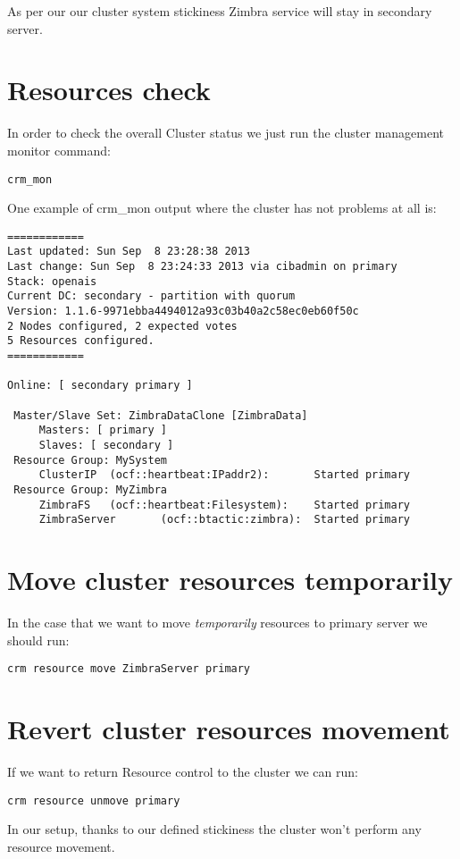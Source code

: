 As per our our cluster system stickiness Zimbra service will stay in secondary server.

\section {Resources check}
In order to check the overall Cluster status we just run the cluster management monitor command:
\begin{verbatim}
crm_mon
\end{verbatim}

One example of crm\_mon output where the cluster has not problems at all is:
\begin{verbatim}
============
Last updated: Sun Sep  8 23:28:38 2013
Last change: Sun Sep  8 23:24:33 2013 via cibadmin on primary
Stack: openais
Current DC: secondary - partition with quorum
Version: 1.1.6-9971ebba4494012a93c03b40a2c58ec0eb60f50c
2 Nodes configured, 2 expected votes
5 Resources configured.
============

Online: [ secondary primary ]

 Master/Slave Set: ZimbraDataClone [ZimbraData]
     Masters: [ primary ]
     Slaves: [ secondary ]
 Resource Group: MySystem
     ClusterIP  (ocf::heartbeat:IPaddr2):       Started primary
 Resource Group: MyZimbra
     ZimbraFS   (ocf::heartbeat:Filesystem):    Started primary
     ZimbraServer       (ocf::btactic:zimbra):  Started primary
\end{verbatim}

\section {Move cluster resources temporarily}
In the case that we want to move \textit{temporarily} resources to primary server we should run:
\begin{verbatim}
crm resource move ZimbraServer primary
\end{verbatim}

\section {Revert cluster resources movement}
If we want to return Resource control to the cluster we can run:
\begin{verbatim}
crm resource unmove primary
\end{verbatim}
In our setup, thanks to our defined stickiness the cluster won't perform any resource movement.

